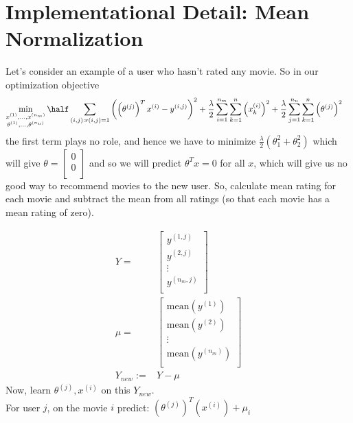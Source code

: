 \section{Implementational Detail: Mean Normalization}
Let's consider an example of a user who hasn't rated any movie. So in our
optimization objective
\begin{align*}
	\min_{\substack{
	x^{(1)}, \dots, x^{(n_m)} \\
			\theta^{(1)}, \dots, \theta^{(n_u)}
	}} {} &
	\half\sum_{(i, j):r(i, j) = 1}\left(
	\left(\theta^{(j)}\right)^Tx^{(i)} - y^{(i, j)}
	\right)^2
	+ \frac{\lambda}{2}\sum_{i=1}^{n_m}\sum_{k=1}^n\left(x_k^{(i)}\right)^2
	+ \frac{\lambda}{2}\sum_{j=1}^{n_u}\sum_{k=1}^n\left(\theta^{(j)}\right)^2
\end{align*}
the first term plays no role, and hence we have to minimize $\frac{\lambda}{2}
	(\theta_1^2 + \theta_2^2)$ which will give $\theta = \begin{bmatrix}
		0 \\
		0 \\
	\end{bmatrix}$ and so we will predict $\theta^Tx = 0$ for all $x$, which
will give us no good way to recommend movies to the new user. So, calculate
mean rating for each movie and subtract the mean from all ratings (so that
each movie has a mean rating of zero).

\begin{align*}
	Y ={}         & \begin{bmatrix}
		y^{(1,j)}   \\
		y^{(2,j)}   \\
		\vdots      \\
		y^{(n_m,j)} \\
	\end{bmatrix} \\
	\mu ={}       & \begin{bmatrix}
		\text{mean}(y^{(1)})   \\
		\text{mean}(y^{(2)})   \\
		\vdots                 \\
		\text{mean}(y^{(n_m)}) \\
	\end{bmatrix} \\
	Y_{new} := {} & Y - \mu
\end{align*}
Now, learn $\theta^{(j)}, x^{(i)}$ on this $Y_{new}$.\\
For user $j$, on the movie $i$ predict: $(\theta^{(j)})^T(x^{(i)}) + \mu_i$

